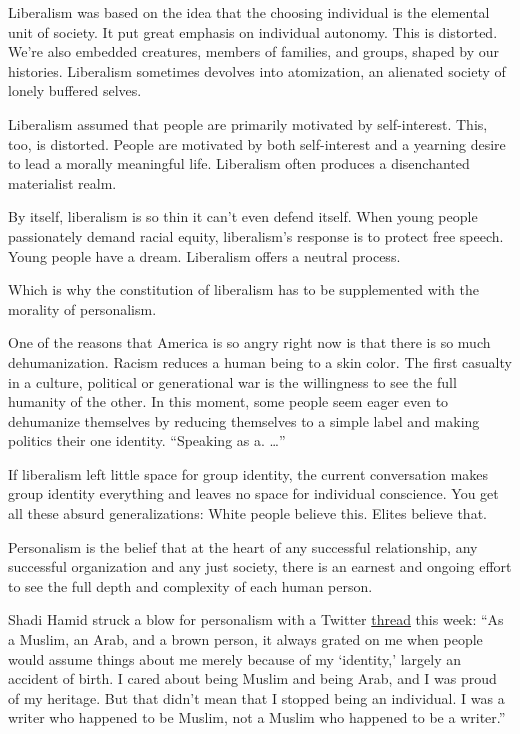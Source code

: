 Liberalism was based on the idea that the choosing individual is the
elemental unit of society. It put great emphasis on individual autonomy.
This is distorted. We're also embedded creatures, members of families,
and groups, shaped by our histories. Liberalism sometimes devolves into
atomization, an alienated society of lonely buffered selves.

Liberalism assumed that people are primarily motivated by self-interest.
This, too, is distorted. People are motivated by both self-interest and
a yearning desire to lead a morally meaningful life. Liberalism often
produces a disenchanted materialist realm.

By itself, liberalism is so thin it can't even defend itself. When young
people passionately demand racial equity, liberalism's response is to
protect free speech. Young people have a dream. Liberalism offers a
neutral process.

Which is why the constitution of liberalism has to be supplemented with
the morality of personalism.

One of the reasons that America is so angry right now is that there is
so much dehumanization. Racism reduces a human being to a skin color.
The first casualty in a culture, political or generational war is the
willingness to see the full humanity of the other. In this moment, some
people seem eager even to dehumanize themselves by reducing themselves
to a simple label and making politics their one identity. ``Speaking as
a. \ldots{}''

If liberalism left little space for group identity, the current
conversation makes group identity everything and leaves no space for
individual conscience. You get all these absurd generalizations: White
people believe this. Elites believe that.

Personalism is the belief that at the heart of any successful
relationship, any successful organization and any just society, there is
an earnest and ongoing effort to see the full depth and complexity of
each human person.

Shadi Hamid struck a blow for personalism with a Twitter
\href{https://twitter.com/shadihamid/status/1280635678506856448}{thread}
this week: ``As a Muslim, an Arab, and a brown person, it always grated
on me when people would assume things about me merely because of my
`identity,' largely an accident of birth. I cared about being Muslim and
being Arab, and I was proud of my heritage. But that didn't mean that I
stopped being an individual. I was a writer who happened to be Muslim,
not a Muslim who happened to be a writer.''

